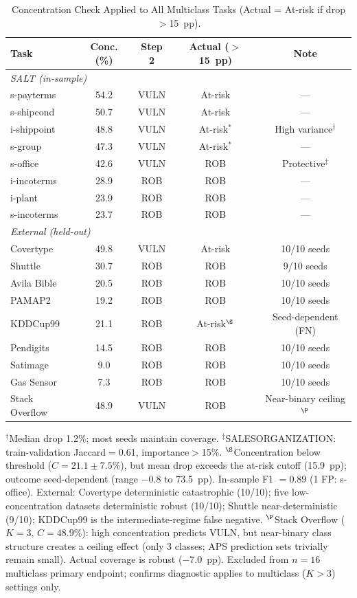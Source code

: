 \documentclass{uai2026} %
\begin{document}
\begin{table}[htbp]
\centering
\caption{Concentration Check Applied to All Multiclass Tasks (Actual = At-risk if drop $>$15~pp).}\label{tab:framework_validation}
\small
\begin{tabular}{@{}lcccc@{}}
\toprule
Task & Conc. (\%) & Step 2 & Actual ($>$15~pp) & Note \\
\midrule
\multicolumn{5}{l}{\textit{SALT (in-sample)}} \\
s-payterms & 54.2 & VULN & At-risk & --- \\
s-shipcond & 50.7 & VULN & At-risk & --- \\
i-shippoint & 48.8 & VULN & At-risk$^*$ & High variance$^\dagger$ \\
s-group & 47.3 & VULN & At-risk$^*$ & --- \\
s-office & 42.6 & VULN & ROB & Protective$^\ddagger$ \\
i-incoterms & 28.9 & ROB & ROB & --- \\
i-plant & 23.9 & ROB & ROB & --- \\
s-incoterms & 23.7 & ROB & ROB & --- \\
\midrule
\multicolumn{5}{l}{\textit{External (held-out)}} \\
Covertype & 49.8 & VULN & At-risk & 10/10 seeds \\
Shuttle & 30.7 & ROB & ROB & 9/10 seeds \\
Avila Bible & 20.5 & ROB & ROB & 10/10 seeds \\
PAMAP2 & 19.2 & ROB & ROB & 10/10 seeds \\
KDDCup99 & 21.1 & ROB & At-risk$^\S$ & Seed-dependent (FN) \\
Pendigits & 14.5 & ROB & ROB & 10/10 seeds \\
Satimage & 9.0 & ROB & ROB & 10/10 seeds \\
Gas Sensor & 7.3 & ROB & ROB & 10/10 seeds \\
Stack Overflow & 48.9 & VULN & ROB & Near-binary ceiling$^\P$ \\
\bottomrule
\end{tabular}


\raggedright
\footnotesize
$^\dagger$Median drop 1.2\%; most seeds maintain coverage.
$^\ddagger$SALESORGANIZATION: train-validation Jaccard$=$0.61, importance$>$15\%.
$^\S$Concentration below threshold ($C=21.1\pm7.5\%$), but mean drop exceeds the at-risk cutoff (15.9~pp); outcome seed-dependent (range $-$0.8 to 73.5~pp).
In-sample F1 $= 0.89$ (1 FP: s-office). External: Covertype deterministic catastrophic (10/10); five low-concentration datasets deterministic robust (10/10); Shuttle near-deterministic (9/10); KDDCup99 is the intermediate-regime false negative.
$^\P$Stack Overflow ($K=3$, $C=48.9\%$): high concentration predicts VULN, but near-binary class structure creates a ceiling effect (only 3 classes; APS prediction sets trivially remain small). Actual coverage is robust ($-7.0$~pp). Excluded from $n=16$ multiclass primary endpoint; confirms diagnostic applies to multiclass ($K>3$) settings only.
\end{table}
\end{document}
